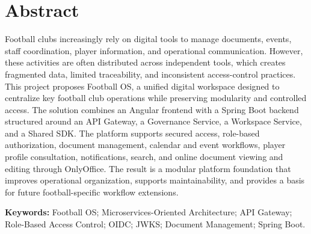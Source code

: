 \chapter*{Abstract}

Football clubs increasingly rely on digital tools to manage documents, events,
staff coordination, player information, and operational communication. However,
these activities are often distributed across independent tools, which creates
fragmented data, limited traceability, and inconsistent access-control
practices. This project proposes Football OS, a unified digital workspace
designed to centralize key football club operations while preserving modularity
and controlled access. The solution combines an Angular frontend with a Spring
Boot backend structured around an API Gateway, a Governance Service, a
Workspace Service, and a Shared SDK. The platform supports secured access,
role-based authorization, document management, calendar and event workflows,
player profile consultation, notifications, search, and online document
viewing and editing through OnlyOffice. The result is a modular platform
foundation that improves operational organization, supports maintainability,
and provides a basis for future football-specific workflow extensions.

\noindent\textbf{Keywords:} Football OS; Microservices-Oriented Architecture; API
Gateway; Role-Based Access Control; OIDC; JWKS; Document Management; Spring Boot.
